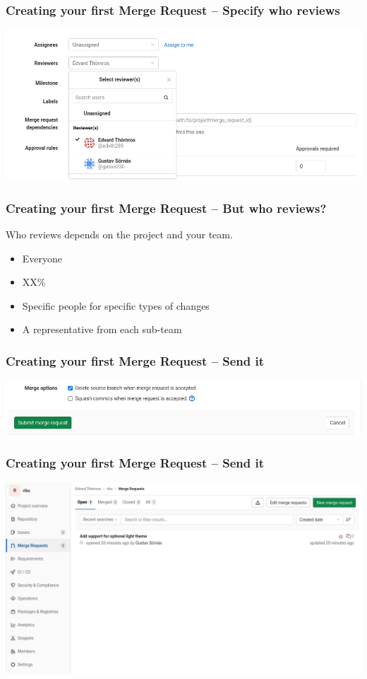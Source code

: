 \documentclass{beamer}
\begin{document}
\begin{frame}[fragile]
  \frametitle{Creating your first Merge Request -- Specify who reviews}
  \includegraphics[width=\linewidth]{merge-request/mr-create-03.png} %
\end{frame}

\begin{frame}
  \frametitle{Creating your first Merge Request -- But who reviews?}
  Who reviews depends on the project and your team.

  \begin{itemize}
    \item Everyone
    \item XX\%
    \item Specific people for specific types of changes
    \item A representative from each sub-team
  \end{itemize}
\end{frame}

\begin{frame}[fragile]
  \frametitle{Creating your first Merge Request -- Send it}
  \includegraphics[width=\linewidth]{merge-request/mr-create-04.png} %
\end{frame}

\begin{frame}[fragile]
  \frametitle{Creating your first Merge Request -- Send it}
  \includegraphics[width=\linewidth]{merge-request/mr-menu-created.png}
\end{frame}
\end{document}
